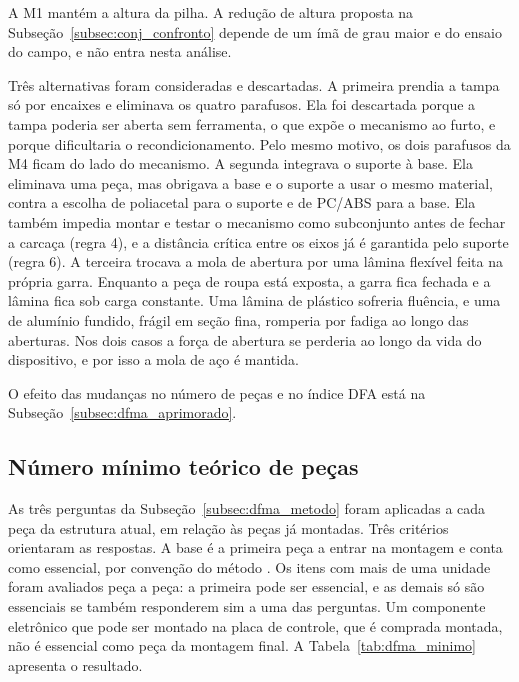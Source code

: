 A M1 mantém a altura da pilha. A redução de altura proposta na Subseção~\ref{subsec:conj_confronto} depende de um ímã de grau maior e do ensaio do campo, e não entra nesta análise.

Três alternativas foram consideradas e descartadas. A primeira prendia a tampa só por encaixes e eliminava os quatro parafusos. Ela foi descartada porque a tampa poderia ser aberta sem ferramenta, o que expõe o mecanismo ao furto, e porque dificultaria o recondicionamento. Pelo mesmo motivo, os dois parafusos da M4 ficam do lado do mecanismo. A segunda integrava o suporte à base. Ela eliminava uma peça, mas obrigava a base e o suporte a usar o mesmo material, contra a escolha de poliacetal para o suporte e de PC/ABS para a base. Ela também impedia montar e testar o mecanismo como subconjunto antes de fechar a carcaça (regra 4), e a distância crítica entre os eixos já é garantida pelo suporte (regra 6). A terceira trocava a mola de abertura por uma lâmina flexível feita na própria garra. Enquanto a peça de roupa está exposta, a garra fica fechada e a lâmina fica sob carga constante. Uma lâmina de plástico sofreria fluência, e uma de alumínio fundido, frágil em seção fina, romperia por fadiga ao longo das aberturas. Nos dois casos a força de abertura se perderia ao longo da vida do dispositivo, e por isso a mola de aço é mantida.

O efeito das mudanças no número de peças e no índice DFA está na Subseção~\ref{subsec:dfma_aprimorado}.

\subsection{Número mínimo teórico de peças}
\label{subsec:dfma_minimo}

As três perguntas da Subseção~\ref{subsec:dfma_metodo} foram aplicadas a cada peça da estrutura atual, em relação às peças já montadas. Três critérios orientaram as respostas. A base é a primeira peça a entrar na montagem e conta como essencial, por convenção do método \cite{boothroyd2011product}. Os itens com mais de uma unidade foram avaliados peça a peça: a primeira pode ser essencial, e as demais só são essenciais se também responderem sim a uma das perguntas. Um componente eletrônico que pode ser montado na placa de controle, que é comprada montada, não é essencial como peça da montagem final. A Tabela~\ref{tab:dfma_minimo} apresenta o resultado.

